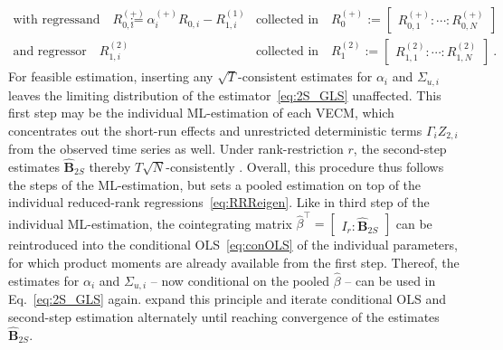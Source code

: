\begin{align}
	\text{with regressand} \quad R^{(+)}_{0,i} & := \alpha_{i}^{(+)} R^{\ }_{0,i} - R_{1,i}^{(1)} & \text{collected in} \quad R_0^{(+)} := \begin{bmatrix} R^{(+)}_{0,1} : \cdots : R^{(+)}_{0,N} \end{bmatrix} & \nonumber \\
	\text{and regressor} \quad R_{1,i}^{(2)} &  & \text{collected in} \quad R_1^{(2)} := \begin{bmatrix} R_{1,1}^{(2)} : \cdots : R_{1,N}^{(2)} \end{bmatrix} &. \nonumber
\end{align}
For feasible estimation, inserting any $ \sqrt{T} $-consistent estimates for $ \alpha_i $ and $ \Sigma_{u,i} $ leaves the limiting distribution of the estimator~\eqref{eq:2S_GLS} unaffected. This first step may be the individual ML-estimation of each VECM, which concentrates out the short-run effects and unrestricted deterministic terms $ \Gamma_i Z_{2,i} $ from the observed time series as well. Under rank-restriction $ r $, the second-step estimates $ \widehat{\mathbf{B}}_{2S}$ thereby $ T\sqrt{N} $-consistently \citep[p.~156, Th.~1]{Breitung2005}. Overall, this procedure thus follows the steps of the ML-estimation, but sets a pooled estimation on top of the individual reduced-rank regressions~\eqref{eq:RRReigen}. Like in third step of the individual ML-estimation, the cointegrating matrix $ \widehat{\beta}^\top = \begin{bmatrix} I_r : \widehat{\mathbf{B}}_{2S} \end{bmatrix} $ can be reintroduced into the conditional OLS~\eqref{eq:conOLS} of the individual parameters, for which product moments are already available from the first step. Thereof, the estimates for $ \alpha_i $ and $ \Sigma_{u,i} $ -- now conditional on the pooled $ \widehat{\beta} $ -- can be used in Eq.~\eqref{eq:2S_GLS} again. \citet[p.~195]{HlouskovaWagner2010} expand this principle and iterate conditional OLS and second-step estimation alternately until reaching convergence of the estimates $ \widehat{\mathbf{B}}_{2S} $.



